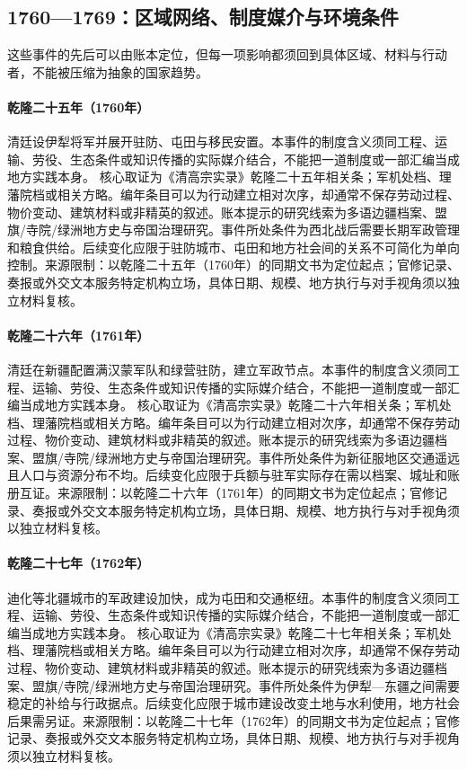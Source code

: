 \subsection{1760—1769：区域网络、制度媒介与环境条件}
这些事件的先后可以由账本定位，但每一项影响都须回到具体区域、材料与行动者，不能被压缩为抽象的国家趋势。
\hypertarget{civic:EQ-1760-ILI-GENERAL}{}\paragraph{乾隆二十五年（1760年）}清廷设伊犁将军并展开驻防、屯田与移民安置。本事件的制度含义须同工程、运输、劳役、生态条件或知识传播的实际媒介结合，不能把一道制度或一部汇编当成地方实践本身。 核心取证为《清高宗实录》乾隆二十五年相关条；军机处档、理藩院档或相关方略。编年条目可以为行动建立相对次序，却通常不保存劳动过程、物价变动、建筑材料或非精英的叙述。账本提示的研究线索为多语边疆档案、盟旗/寺院/绿洲地方史与帝国治理研究。事件所处条件为西北战后需要长期军政管理和粮食供给。后续变化应限于驻防城市、屯田和地方社会间的关系不可简化为单向控制。来源限制：以乾隆二十五年（1760年）的同期文书为定位起点；官修记录、奏报或外交文本服务特定机构立场，具体日期、规模、地方执行与对手视角须以独立材料复核。
\hypertarget{civic:EQ-1761-XINJIANG-GARRISONS}{}\paragraph{乾隆二十六年（1761年）}清廷在新疆配置满汉蒙军队和绿营驻防，建立军政节点。本事件的制度含义须同工程、运输、劳役、生态条件或知识传播的实际媒介结合，不能把一道制度或一部汇编当成地方实践本身。 核心取证为《清高宗实录》乾隆二十六年相关条；军机处档、理藩院档或相关方略。编年条目可以为行动建立相对次序，却通常不保存劳动过程、物价变动、建筑材料或非精英的叙述。账本提示的研究线索为多语边疆档案、盟旗/寺院/绿洲地方史与帝国治理研究。事件所处条件为新征服地区交通遥远且人口与资源分布不均。后续变化应限于兵额与驻军实际存在需以档案、城址和账册互证。来源限制：以乾隆二十六年（1761年）的同期文书为定位起点；官修记录、奏报或外交文本服务特定机构立场，具体日期、规模、地方执行与对手视角须以独立材料复核。
\hypertarget{civic:EQ-1762-URUMQI-FOUNDATION}{}\paragraph{乾隆二十七年（1762年）}迪化等北疆城市的军政建设加快，成为屯田和交通枢纽。本事件的制度含义须同工程、运输、劳役、生态条件或知识传播的实际媒介结合，不能把一道制度或一部汇编当成地方实践本身。 核心取证为《清高宗实录》乾隆二十七年相关条；军机处档、理藩院档或相关方略。编年条目可以为行动建立相对次序，却通常不保存劳动过程、物价变动、建筑材料或非精英的叙述。账本提示的研究线索为多语边疆档案、盟旗/寺院/绿洲地方史与帝国治理研究。事件所处条件为伊犁—东疆之间需要稳定的补给与行政据点。后续变化应限于城市建设改变土地与水利使用，地方社会后果需另证。来源限制：以乾隆二十七年（1762年）的同期文书为定位起点；官修记录、奏报或外交文本服务特定机构立场，具体日期、规模、地方执行与对手视角须以独立材料复核。
